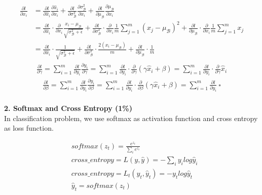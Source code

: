 \documentclass{article}
\begin{document}
\begin{align*}
    \frac{\partial l}{\partial x_i} &= \frac{\partial l}{\partial {\hat x}_i} \frac{\partial {\hat x}_i}{\partial x_i} + \frac{\partial l}{\partial \sigma^2_{\mathcal B}} \frac{\partial \sigma^2_{\mathcal B}}{\partial x_i} + \frac{\partial l}{\partial \mu_{\mathcal B}} \frac{\partial \mu_{\mathcal B}}{\partial x_i}\\
    &= \frac{\partial l}{\partial {\hat x}_i} \cdot \frac{\partial}{\partial x_i} \frac{x_i - \mu_{\mathcal B}}{\sqrt{\sigma^2_{\mathcal B} + \epsilon}} + \frac{\partial l}{\partial \sigma^2_{\mathcal B}} \cdot \frac{\partial}{\partial x_i} \frac{1}{m} \sum_{j = 1}^m (x_j - \mu_{\mathcal B})^2 + \frac{\partial l}{\partial \mu_{\mathcal B}} \cdot \frac{\partial}{\partial x_i} \frac{1}{m} \sum_{j = 1}^m x_j\\
    &= \frac{\partial l}{\partial {\hat x}_i} \cdot \frac{1}{\sqrt{\sigma^2_{\mathcal B} + \epsilon}} + \frac{\partial l}{\partial \sigma^2_{\mathcal B}} \cdot \frac{2(x_i - \mu_{\mathcal B})}{m} + \frac{\partial l}{\partial \mu_{\mathcal B}} \cdot \frac{1}{m}
\end{align*}
\begin{align*}
    \frac{\partial l}{\partial \gamma} = \sum_{i = 1}^m \frac{\partial l}{\partial y_i} \frac{\partial y_i}{\partial \gamma} = \sum_{i = 1}^m \frac{\partial l}{\partial y_i} \cdot \frac{\partial}{\partial \gamma} (\gamma {\hat x}_i + \beta) = \sum_{i = 1}^m \frac{\partial l}{\partial y_i} \cdot \frac{\partial}{\partial \gamma} {\hat x}_i
\end{align*}
\begin{align*}
    \frac{\partial l}{\partial \beta} = \sum_{i = 1}^m \frac{\partial l}{\partial y_i} \frac{\partial y_i}{\partial \beta} = \sum_{i = 1}^m \frac{\partial l}{\partial y_i} \cdot \frac{\partial}{\partial \beta} (\gamma {\hat x}_i + \beta) = \sum_{i = 1}^m \frac{\partial l}{\partial y_i}\ \square\\
\end{align*}

\noindent
{\bf \Large 2. Softmax and Cross Entropy (1\%)}\\

In classification problem, we use softmax as activation function and cross entropy as loss function.

\begin{align*}
    &softmax(z_t) = \frac{e^{z_t}}{\sum_i e^{z_i}}\\
    &cross\_entropy = L(y, {\hat y}) = −\sum_i y_i log{\hat y}_i\\
    &cross\_entropy = L_t(y_t, {\hat y}_t) = −y_t log {\hat y}_t\\
    &{\hat y}_t = softmax(z_t)\\
\end{align*}
\end{document}
